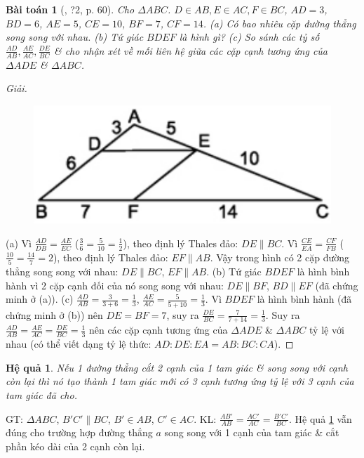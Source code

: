 \documentclass{article}
\newtheorem{baitoan}{Bài toán}
\newtheorem{hequa}{Hệ quả}
\begin{document}
\begin{baitoan}[\cite{SGK_Toan_8_tap_2}, ?2, p. 60]
	Cho $\Delta ABC$. $D\in AB,E\in AC,F\in BC$, $AD = 3$, $BD = 6$, $AE = 5$, $CE = 10$, $BF = 7$, $CF = 14$. (a) Có bao nhiêu cặp đường thẳng song song với nhau. (b) Tứ giác $BDEF$ là hình gì? (c) So sánh các tỷ số $\frac{AD}{AB},\frac{AE}{AC},\frac{DE}{BC}$ \& cho nhận xét về mối liên hệ giữa các cặp cạnh tương ứng của $\Delta ADE$ \& $\Delta ABC$.
\end{baitoan}

\begin{proof}[Giải]
	\begin{figure}[H]
		\centering
		\includegraphics[scale=0.25]{SGK_Toan_8_9}
	\end{figure}
	(a) Vì $\frac{AD}{DB} = \frac{AE}{EC}$ ($\frac{3}{6} = \frac{5}{10} = \frac{1}{2}$), theo định lý Thales đảo: $DE\parallel BC$. Vì $\frac{CE}{EA} = \frac{CF}{FB}$ ($\frac{10}{5} = \frac{14}{7} = 2$), theo định lý Thales đảo: $EF\parallel AB$. Vậy trong hình có 2 cặp đường thẳng song song với nhau: $DE\parallel BC$, $EF\parallel AB$. (b) Tứ giác $BDEF$ là hình bình hành vì 2 cặp cạnh đối của nó song song với nhau: $DE\parallel BF$, $BD\parallel EF$ (đã chứng minh ở (a)). (c) $\frac{AD}{AB} = \frac{3}{3 + 6} = \frac{1}{3}$, $\frac{AE}{AC} = \frac{5}{5 + 10} = \frac{1}{3}$. Vì $BDEF$ là hình bình hành (đã chứng minh ở (b)) nên $DE = BF = 7$, suy ra $\frac{DE}{BC} = \frac{7}{7 + 14} = \frac{1}{3}$. Suy ra $\frac{AD}{AB} = \frac{AE}{AC} = \frac{DE}{BC} = \frac{1}{3}$ nên các cặp cạnh tương ứng của $\Delta ADE$ \& $\Delta ABC$ tỷ lệ với nhau (có thể viết dạng tỷ lệ thức: $AD:DE:EA = AB:BC:CA$).
\end{proof}

\begin{hequa}
	\label{col: Thales}
	Nếu 1 đường thẳng cắt 2 cạnh của 1 tam giác \& song song với cạnh còn lại thì nó tạo thành 1 tam giác mới có 3 cạnh tương ứng tỷ lệ với 3 cạnh của tam giác đã cho.
\end{hequa}
GT: $\Delta ABC$, $B'C'\parallel BC$, $B'\in AB$, $C'\in AC$. KL: $\frac{AB'}{AB} = \frac{AC'}{AC} = \frac{B'C'}{BC}$. Hệ quả \ref{col: Thales} vẫn đúng cho trường hợp đường thẳng $a$ song song với 1 cạnh của tam giác \& cắt phần kéo dài của 2 cạnh còn lại.
\end{document}
